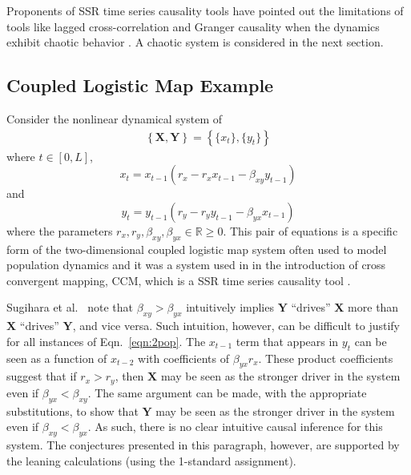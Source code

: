\documentclass[twocolumn,aps,pre,groupedaddress]{revtex4-1}
\begin{document}
Proponents of SSR time series causality tools have pointed out the limitations of tools like lagged cross-correlation and Granger causality when the dynamics exhibit chaotic behavior \cite{Sugihara2012}.  A chaotic system is considered in the next section.

\subsection{Coupled Logistic Map Example}
\label{sec:2Pop}
Consider the nonlinear dynamical system of
\begin{eqnarray}
\label{eqn:2pop}
\left\{\mathbf{X},\mathbf{Y}\right\} = \left\{\{x_t\},\{y_t\}\right\}
\end{eqnarray}
where $t\in[0,L]$,
\begin{equation*}
x_t = x_{t-1}\left(r_x-r_x x_{t-1}-\beta_{xy} y_{t-1}\right)
\end{equation*}
and
\begin{equation*}
y_t = y_{t-1}\left(r_y-r_y y_{t-1}-\beta_{yx} x_{t-1}\right)
\end{equation*}
where the parameters $r_x,r_y,\beta_{xy},\beta_{yx}\in\mathbb{R}\ge 0$.  This pair of equations is a specific form of the two-dimensional coupled logistic map system often used to model population dynamics \cite{Lloyd1995} and it was a system used in in the introduction of cross convergent mapping, CCM, which is a SSR time series causality tool \cite{Sugihara2012}.

Sugihara et al.\ \cite{Sugihara2012} note that $\beta_{xy}>\beta_{yx}$ intuitively implies $\mathbf{Y}$ ``drives'' $\mathbf{X}$ more than $\mathbf{X}$ ``drives'' $\mathbf{Y}$, and vice versa.  Such intuition, however, can be difficult to justify for all instances of Eqn.\ \ref{eqn:2pop}.  The $x_{t-1}$ term that appears in $y_t$ can be seen as a function of $x_{t-2}$ with coefficients of $\beta_{yx}r_x$.  These product coefficients suggest that if $r_x>r_y$, then $\mathbf{X}$ may be seen as the stronger driver in the system even if $\beta_{yx}<\beta_{xy}$.  The same argument can be made, with the appropriate substitutions, to show that $\mathbf{Y}$ may be seen as the stronger driver in the system even if $\beta_{xy}<\beta_{yx}$.  As such, there is no clear intuitive causal inference for this system.  The conjectures presented in this paragraph, however, are supported by the leaning calculations (using the 1-standard assignment).
\end{document}
